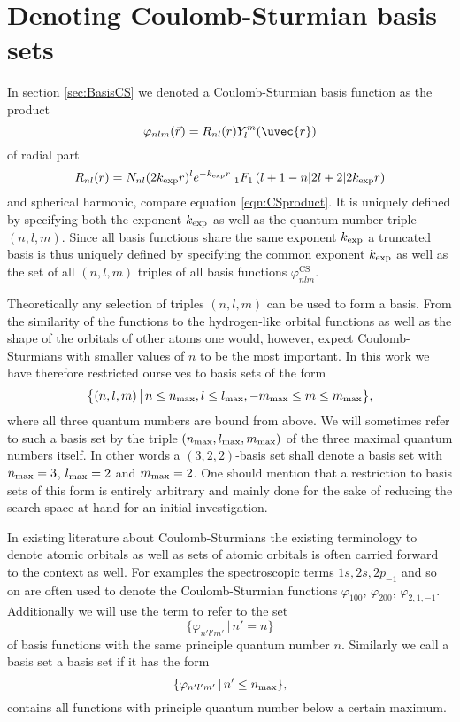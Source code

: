 \section{Denoting Coulomb-Sturmian basis sets}
\label{sec:DenotingCSbasis}
In section \vref{sec:BasisCS}
we denoted a Coulomb-Sturmian basis function as the product
\begin{equation}
	\varphi_{nlm}(\vec{r}) = R_{nl}(r) Y_l^m(\uvec{r})
\end{equation}
of radial part
\begin{equation}
	\label{eqn:RadialPartCsRepeated}
	R_{nl}(r) = N_{nl} (2k_\text{exp} r)^l e^{-k_\text{exp} r}
	\;_1F_1\left(l+1-n \middle| 2l+2 \middle|2k_\text{exp} r\right)
\end{equation}
and spherical harmonic, compare equation \eqref{eqn:CSproduct}.
It is uniquely defined by specifying both the \CS exponent $k_\text{exp}$
as well as the quantum number triple $(n,l,m)$.
Since all basis functions share the same exponent $k_\text{exp}$
a truncated \CS basis is thus uniquely defined by specifying
the common exponent $k_\text{exp}$ as well as the set of all $(n, l, m)$
triples of all basis functions $\varphi^\text{CS}_{nlm}$.

Theoretically any selection of triples $(n, l, m)$ can be used to form a \CS basis.
From the similarity of the \CS functions to the hydrogen-like orbital functions
as well as the shape of the orbitals of other atoms
one would, however, expect Coulomb-Sturmians with smaller values of $n$
to be the most important.
In this work we have therefore restricted ourselves to \CS basis sets
of the form
\[ \big\{ (n, l, m) \, \big| \, n \le n_\text{max}, l \le l_\text{max}, -m_\text{max} \le m \le m_\text{max} \big\}, \]
\ie where all three quantum numbers are bound from above.
We will sometimes refer to such a \CS basis set by the triple
$(n_\text{max}, l_\text{max}, m_\text{max})$ of the three maximal quantum numbers itself.
In other words a $(3,2,2)$-basis set shall denote a basis set with
$n_\text{max} = 3$, $l_\text{max} = 2$ and $m_\text{max} = 2$.
One should mention that a restriction to basis sets of this form
is entirely arbitrary
and mainly done for the sake of reducing the search space at hand
for an initial investigation.

In existing literature about Coulomb-Sturmians the existing terminology
to denote atomic orbitals as well as sets of atomic orbitals is often carried
forward to the \CS context as well.
For examples the spectroscopic terms $1s, 2s, 2p_{-1}$ and so on
are often used to denote the Coulomb-Sturmian functions
$\varphi_{100}$, $\varphi_{200}$, $\varphi_{2,1,-1}$.
Additionally we will use the term  to refer to the set
\[ \{ \varphi_{n'l'm'} \, | \, n' = n \} \]
of \CS basis functions with the same principle quantum number $n$.
Similarly we call a \CS basis set a  basis set
if it has the form
\[ \{ \varphi_{n'l'm'} \, | \, n' \leq n_\text{max} \}, \]
\ie contains all \CS functions with principle quantum number
below a certain maximum.
